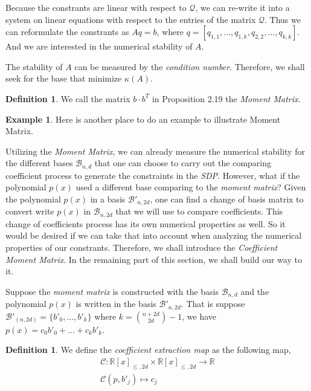 \documentclass[12pt]{amsart}
\numberwithin{equation}{section}
\theoremstyle{definition}
\newtheorem{definition}[thm]{Definition}
\newtheorem{example}[thm]{Example}
\numberwithin{thm}{section}
\begin{document}
\smallskip
Because the constrants are linear with respect to $\mathcal{Q}$, we can re-write it into a system on linear equations with respect to the entries of the matrix $\mathcal{Q}$. Thus we can reformulate the constrants as
$A q = b$, where $q = [q_{1,1}, ..., q_{1, k}, q_{2, 2}, ... ,q_{k, k}]$. And we are interested in the numerical stability of $A$. 

The stability of $A$ can be measured by the \emph{condition number}. Therefore, we shall seek for the base that minimize $\kappa(A)$. \cite{Recher:Masterthesis}

\begin{definition}
     We call the matrix $b \cdot b^T$ in Proposition 2.19 the \emph{Moment Matrix}.
\end{definition}

\begin{example}
     Here is another place to do an example to illustrate Moment Matrix.
\end{example}

\smallskip
Utilizing the \emph{Moment Matrix}, 
we can already measure the numerical stability for the different bases $\mathcal{B}_{n, d}$ that one can choose to carry out the comparing coefficient process to generate the constraints in the \emph{SDP}.
However, what if the polynomial $p(x)$ used a different base comparing to the \emph{moment matrix}?
\smallskip
Given the polynomial $p(x)$ in a basis $\mathcal{B'}_{n, 2d}$, one can find a change of basis matrix to convert write $p(x)$ in $\mathcal{B}_{n, 2d}$ that we will use to compare coefficients.
This change of coefficients process has its own numerical properties as well. So it would be desired if we can take that into account when analyzing the numerical properties of our constrants. 
Therefore, we shall introduce the \emph{Coefficient Moment Matrix}. In the remaining part of this section, we shall build our way to it.

\smallskip
Suppose the \emph{moment matrix} is constructed with the basis $\mathcal{B}_{n, d}$ and the polynomial $p(x)$ is written in the basis $\mathcal{B}'_{n, 2d}$. 
That is suppose $\mathcal{B}'_(n, 2d) = \{b'_0, ..., b'_k\}$ where $k = {n + 2d \choose 2d} - 1$, we have $p(x) = c_0b'_0 + ... + c_kb'_k$.
\begin{definition}
We define the \emph{coefficient extraction map} as the following map,
\begin{equation}
     \begin{split}
     \mathcal{C}: \mathbb{R}[x]_{\leq, 2d} \times \mathbb{R}[x]_{\leq, 2d} \rightarrow \mathbb{R} \\
     \mathcal{C}(p, b'_j) \mapsto c_j
     \end{split}
\end{equation}
\cite{Recher:Masterthesis}
\end{definition}
\end{document}
